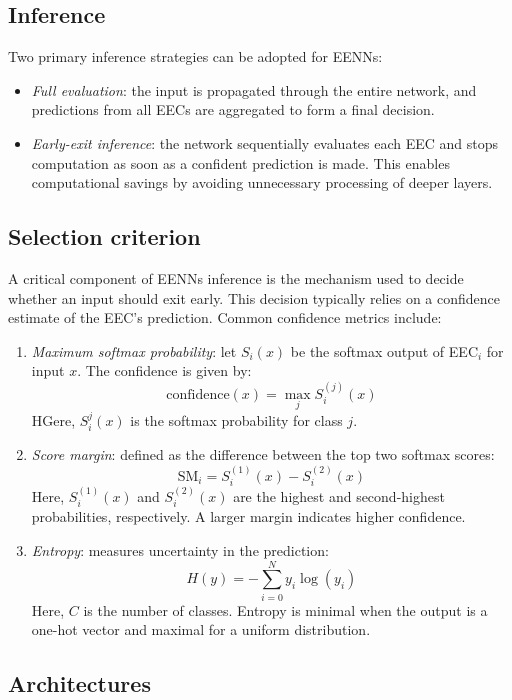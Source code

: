 \subsection{Inference}
Two primary inference strategies can be adopted for EENNs:
\begin{itemize}
    \item \textit{Full evaluation}: the input is propagated through the entire network, and predictions from all EECs are aggregated to form a final decision.
    \item \textit{Early-exit inference}: the network sequentially evaluates each EEC and stops computation as soon as a confident prediction is made. 
        This enables computational savings by avoiding unnecessary processing of deeper layers.
\end{itemize}

\subsection{Selection criterion}
A critical component of EENNs inference is the mechanism used to decide whether an input should exit early. 
This decision typically relies on a confidence estimate of the EEC's prediction. Common confidence metrics include:
\begin{enumerate}
    \item \textit{Maximum softmax probability}: let $S_i(x)$ be the softmax output of EEC$_i$ for input $x$. 
        The confidence is given by:
        \[\text{confidence}(x)=\max_jS_i^{(j)}(x)\]
        HGere, $S_i^j(x)$ is the softmax probability for class $j$.
    \item \textit{Score margin}: defined as the difference between the top two softmax scores:
        \[\text{SM}_i=S_i^{(1)}(x)-S_i^{(2)}(x)\]
        Here, $S_i^{(1)}(x)$ and $S_i^{(2)}(x)$ are the highest and second-highest probabilities, respectively. 
        A larger margin indicates higher confidence.
    \item \textit{Entropy}: measures uncertainty in the prediction:
        \[H(y) = -\sum_{i=0}^N y_i\log(y_i)\]
        Here, $C$ is the number of classes. 
        Entropy is minimal when the output is a one-hot vector and maximal for a uniform distribution. 
\end{enumerate}

\subsection{Architectures}
